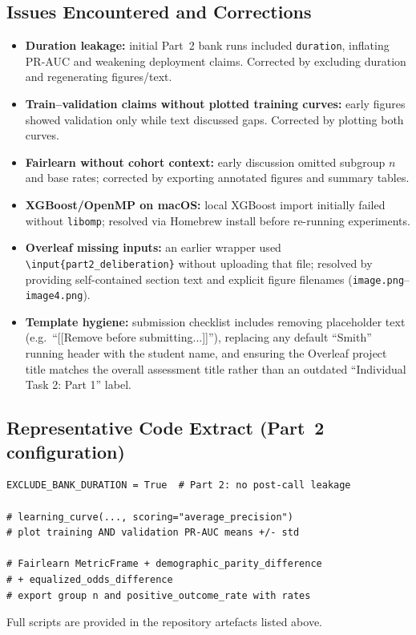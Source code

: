 \documentclass[11pt,a4paper]{article}
\begin{document}
\subsection{Issues Encountered and Corrections}
\begin{itemize}
    \item \textbf{Duration leakage:} initial Part~2 bank runs included \texttt{duration},
    inflating PR-AUC and weakening deployment claims. Corrected by excluding duration and
    regenerating figures/text.
    \item \textbf{Train--validation claims without plotted training curves:} early figures
    showed validation only while text discussed gaps. Corrected by plotting both curves.
    \item \textbf{Fairlearn without cohort context:} early discussion omitted subgroup $n$
    and base rates; corrected by exporting annotated figures and summary tables.
    \item \textbf{XGBoost/OpenMP on macOS:} local XGBoost import initially failed without
    \texttt{libomp}; resolved via Homebrew install before re-running experiments.
    \item \textbf{Overleaf missing inputs:} an earlier wrapper used
    \texttt{\textbackslash input\{part2\_deliberation\}} without uploading that file;
    resolved by providing self-contained section text and explicit figure filenames
    (\texttt{image.png}--\texttt{image4.png}).
    \item \textbf{Template hygiene:} submission checklist includes removing placeholder
    text (e.g.\ ``[[Remove before submitting...]]''), replacing any default ``Smith''
    running header with the student name, and ensuring the Overleaf project title matches
    the overall assessment title rather than an outdated ``Individual Task 2: Part 1''
    label.
\end{itemize}

\subsection{Representative Code Extract (Part~2 configuration)}
\begin{verbatim}
EXCLUDE_BANK_DURATION = True  # Part 2: no post-call leakage

# learning_curve(..., scoring="average_precision")
# plot training AND validation PR-AUC means +/- std

# Fairlearn MetricFrame + demographic_parity_difference
# + equalized_odds_difference
# export group n and positive_outcome_rate with rates
\end{verbatim}
Full scripts are provided in the repository artefacts listed above.



\end{document}
